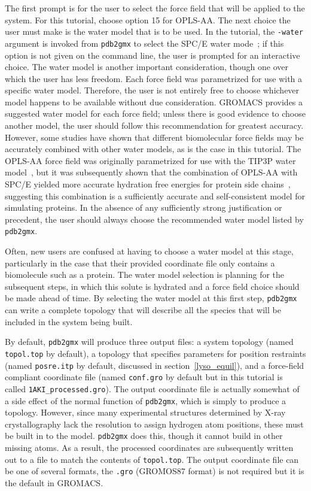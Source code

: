 \documentclass[9pt,tutorial]{livecoms}
\begin{document}
The first prompt is for the user to select the force field that will be applied to the system. For this tutorial, choose option 15 for OPLS-AA. The next choice the user must make is the water model that is to be used. In the tutorial, the \texttt{-water} argument is invoked from \texttt{pdb2gmx} to select the SPC/E water mode~\cite{Berendsen1987}; if this option is not given on the command line, the user is prompted for an interactive choice. The water model is another important consideration, though one over which the user has less freedom. Each force field was parametrized for use with a specific water model. Therefore, the user is not entirely free to choose whichever model happens to be available without due consideration. GROMACS provides a suggested water model for each force field; unless there is good evidence to choose another model, the user should follow this recommendation for greatest accuracy. However, some studies have shown that different biomolecular force fields may be accurately combined with other water models, as is the case in this tutorial. The OPLS-AA force field was originally parametrized for use with the TIP3P water model~\cite{Jorgensen1984}, but it was subsequently shown that the combination of OPLS-AA with SPC/E yielded more accurate hydration free energies for protein side chains~\cite{Hess2006}, suggesting this combination is a sufficiently accurate and self-consistent model for simulating proteins. In the absence of any sufficiently strong justification or precedent, the user should always choose the recommended water model listed by \texttt{pdb2gmx}.

Often, new users are confused at having to choose a water model at this stage, particularly in the case that their provided coordinate file only contains a biomolecule such as a protein. The water model selection is planning for the subsequent steps, in which this solute is hydrated and a force field choice should be made ahead of time. By selecting the water model at this first step, \texttt{pdb2gmx} can write a complete topology that will describe all the species that will be included in the system being built.

By default, \texttt{pdb2gmx} will produce three output files: a system topology (named \texttt{topol.top} by default), a topology that specifies parameters for position restraints (named \texttt{posre.itp} by default, discussed in section~\ref{lyso_equil}), and a force-field compliant coordinate file (named \texttt{conf.gro} by default but in this tutorial is called \texttt{1AKI\_processed.gro}). The output coordinate file is actually somewhat of a side effect of the normal function of \texttt{pdb2gmx}, which is simply to produce a topology. However, since many experimental structures determined by X-ray crystallography lack the resolution to assign hydrogen atom positions, these must be built in to the model. \texttt{pdb2gmx} does this, though it cannot build in other missing atoms. As a result, the processed coordinates are subsequently written out to a file to match the contents of \texttt{topol.top}. The output coordinate file can be one of several formats, the \texttt{.gro} (GROMOS87 format) is not required but it is the default in GROMACS.
\end{document}
